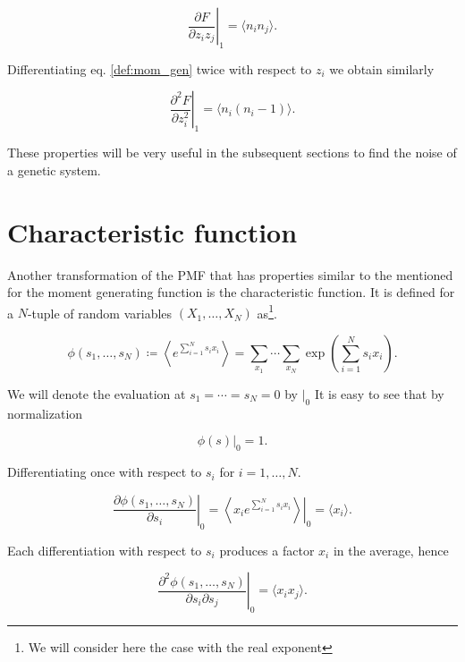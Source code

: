 \begin{equation*}
\left. \frac{\partial F}{\partial z_i z_j} \right|_1 = \langle n_i n_j \rangle.
\end{equation*}

Differentiating eq. \ref{def:mom_gen} twice with respect to $z_i$ we obtain similarly

\begin{equation*}
\left. \frac{\partial^2F}{\partial z_i^2}\right|_1 = \langle n_i(n_i-1) \rangle.
\end{equation*}

These properties will be very useful in the subsequent sections to find the noise of a genetic system.

\section{Characteristic function}

Another transformation of the PMF that has properties similar to the mentioned for the moment generating function is the characteristic function. It is defined for a $N$-tuple of random variables $(X_1,\dotsc,X_N)$ as\footnote{We will consider here the case with the real exponent}.

\begin{equation*}
  \phi(s_1,\dotsc,s_N)\coloneqq \left\langle e^{\sum_{i=1}^Ns_ix_i}\right\rangle = \sum_{x_1}\dotsi\sum_{x_N}\exp\left(\sum_{i=1}^Ns_ix_i\right).
\end{equation*}

We will denote the evaluation at $s_1=\dotsb=s_N=0$ by $|_0$ It is easy to see that by normalization

\begin{equation*}
  \phi(s)|_0 = 1.
\end{equation*}

Differentiating once with respect to $s_i$ for $i=1,\dotsc,N$.

\begin{equation*}
  \left.\frac{\partial\phi(s_1,\dotsc,s_N)}{\partial s_i}\right|_0 = \left.\left\langle x_i e^{\sum_{i=1}^Ns_ix_i}\right\rangle\right|_0 = \langle x_i\rangle.
\end{equation*}

Each differentiation with respect to $s_i$ produces a factor $x_i$ in the average, hence

\begin{equation*}
  \left.\frac{\partial^2\phi(s_1,\dotsc,s_N)}{\partial s_i \partial s_j}\right|_0 = \langle x_ix_j\rangle.
\end{equation*}

